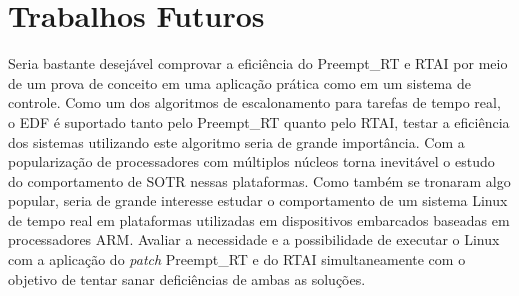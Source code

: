 \section{Trabalhos Futuros}
Seria bastante desejável comprovar a eficiência do Preempt\_RT e RTAI por meio de um prova de conceito em uma aplicação prática como em um sistema de controle.
Como um dos algoritmos de escalonamento para tarefas de tempo real, o EDF é suportado tanto  pelo Preempt_RT quanto pelo RTAI, testar a eficiência dos sistemas utilizando este algoritmo seria de grande importância.
Com a popularização de processadores com múltiplos núcleos torna inevitável o estudo do comportamento de SOTR nessas plataformas. Como também se tronaram algo popular, seria de grande interesse estudar o comportamento de um sistema Linux de tempo real em plataformas utilizadas em dispositivos embarcados baseadas em processadores ARM.
Avaliar a necessidade e a possibilidade de executar o Linux com a aplicação do \textit{patch} Preempt\_RT e do RTAI simultaneamente com o objetivo de tentar sanar deficiências de ambas as soluções.
